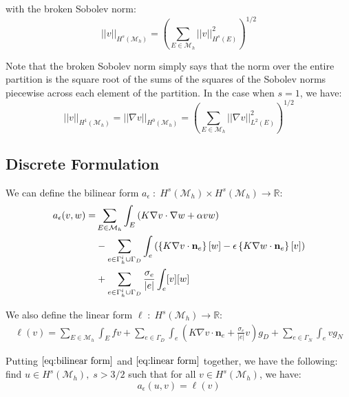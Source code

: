 \documentclass[10pt]{article}
\numberwithin{equation}{section}
\begin{document}
	\noindent with the broken Sobolev norm:
	\begin{equation}
		||v||_{H^{s}(\mathcal{M}_{h})} = \left(\sum_{E\in\mathcal{M}_{h}}||v||^{2}_{H^{s}(E)}\right)^{1/2}
	\end{equation}
	
	\noindent Note that the broken Sobolev norm simply says that the norm over the entire partition is the square root of the sums of the squares of the Sobolev norms piecewise across each element of the partition. In the case when $s=1$, we have:
	\begin{equation}
		||v||_{H^{1}(\mathcal{M}_{h})} = ||\nabla v||_{H^{0}(\mathcal{M}_{h})} = \left(\sum_{E\in\mathcal{M}_{h}}||\nabla v||^{2}_{L^{2}(E)}\right)^{1/2}
	\end{equation}
	
	\subsection{Discrete Formulation}
	We can define the bilinear form $a_{\epsilon}\;:\;H^{s}(\mathcal{M}_{h})\times H^{s}(\mathcal{M}_{h}) \to \mathbb{R}$:
	\begin{align}
		a_{\epsilon}(v,w) = &\sum_{E\in\mathcal{M}_{h}}\int_{E}\left(K\nabla v\cdot\nabla w + \alpha vw\right)\notag\\
		 			     &- \sum_{e\in\Gamma_{h}^{i}\cup\Gamma_{D}}\int_{e}\left(\left\{K\nabla v\cdot\mathbf{n}_{e}\right\}[w] - \epsilon\left\{K\nabla w\cdot\mathbf{n}_{e}\right\}[v]\right)\notag\\
					     &+\sum_{e\in\Gamma_{h}^{i}\cup\Gamma_{D}}\frac{\sigma_{e}}{|e|}\int_{e}[v][w]\label{eq:bilinear form}
	\end{align}
	
	\noindent We also define the linear form $\ell\;:\;H^{s}(\mathcal{M}_{h}) \to \mathbb{R}$:
	\begin{align}
		\ell(v) = \sum_{E\in\mathcal{M}_{h}}\int_{E}fv + \sum_{e\in\Gamma_{D}}\int_{e}\left(K\nabla v\cdot\mathbf{n}_{e} + \frac{\sigma_{e}}{|e|}v\right)g_{D} + \sum_{e\in\Gamma_{N}}\int_{e}vg_{N}\label{eq:linear form}
	\end{align}
	
	\noindent Putting $\eqref{eq:bilinear form}$ and $\eqref{eq:linear form}$ together, we have the following: find $u\in H^{s}(\mathcal{M}_{h}),\;s>3/2$ such that for all $v\in H^{s}(\mathcal{M}_{h})$, we have:
	\begin{equation*}
		a_{\epsilon}(u,v) = \ell(v)
	\end{equation*}
	
\end{document}
